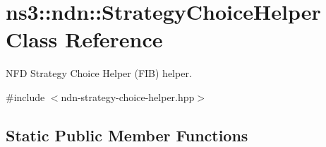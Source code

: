 \hypertarget{classns3_1_1ndn_1_1StrategyChoiceHelper}{}\section{ns3\+:\+:ndn\+:\+:Strategy\+Choice\+Helper Class Reference}
\label{classns3_1_1ndn_1_1StrategyChoiceHelper}


N\+FD Strategy Choice Helper (F\+IB) helper.  




{\ttfamily \#include $<$ndn-\/strategy-\/choice-\/helper.\+hpp$>$}

\subsection*{Static Public Member Functions}
